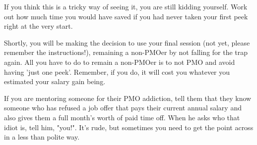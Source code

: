 \documentclass[easypeasy.tex]{subfiles}
\begin{document}
If you think this is a tricky way of seeing it, you are still kidding yourself. Work out how much time you would have saved if you had never taken your first peek right at the very start.

Shortly, you will be making the decision to use your final session (not yet, please remember the instructions!), remaining a non-PMOer by not falling for the trap again. All you have to do to remain a non-PMOer is to not PMO and avoid having 'just one peek'. Remember, if you do, it will cost you whatever you estimated your salary gain being.

If you are mentoring someone for their PMO addiction, tell them that they know someone who has refused a job offer that pays their current annual salary and also gives them a full month's worth of paid time off. When he asks who that idiot is, tell him, "you!". It's rude, but sometimes you need to get the point across in a less than polite way.
\end{document}

